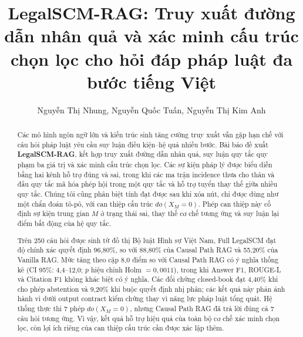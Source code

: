 \documentclass[runningheads]{llncs}
\begin{document}
\title{LegalSCM-RAG: Truy xuất đường dẫn nhân quả và xác minh cấu trúc chọn lọc cho hỏi đáp pháp luật đa bước tiếng Việt}

\author{Nguyễn Thị Nhung, Nguyễn Quốc Tuấn, Nguyễn Thị Kim Anh}


\maketitle
\pagestyle{empty}

\begin{abstract}
Các mô hình ngôn ngữ lớn và kiến trúc sinh tăng cường truy xuất vẫn gặp hạn chế
với câu hỏi pháp luật yêu cầu suy luận điều kiện--hệ quả nhiều bước. Bài báo đề
xuất \textbf{LegalSCM-RAG}, kết hợp truy xuất đường dẫn nhân quả, suy luận quy
tắc quy phạm ba giá trị và xác minh cấu trúc chọn lọc. Các sự kiện pháp lý được
biểu diễn bằng hai kênh hỗ trợ đúng và sai, trong khi các ma trận incidence thưa
cho thân và đầu quy tắc mã hóa phép hội trong một quy tắc và hỗ trợ tuyển thay
thế giữa nhiều quy tắc. Chúng tôi cũng phân biệt tính đạt được sau khi xóa nút,
chỉ được dùng như một chẩn đoán tô-pô, với can thiệp cấu trúc $do(X_M=0)$.
Phép can thiệp này cố định sự kiện trung gian $M$ ở trạng thái sai, thay thế cơ
chế tương ứng và suy luận lại điểm bất động của hệ quy tắc.

Trên 250 câu hỏi được sinh từ đồ thị Bộ luật Hình sự Việt Nam, Full LegalSCM đạt
độ chính xác quyết định 96,80\%, so với 88,80\% của Causal Path RAG và 55,20\%
của Vanilla RAG. Mức tăng theo cặp 8,0 điểm so với Causal Path RAG có ý nghĩa
thống kê (CI 95\%: 4,4--12,0; $p$ hiệu chỉnh Holm $=0,0011$), trong khi Answer
F1, ROUGE-L và Citation F1 không khác biệt có ý nghĩa. Các đối chứng closed-book
đạt 4,40\% khi cho phép abstention và 9,20\% khi buộc quyết định nhị phân; các
kết quả này phản ánh hành vi dưới output contract kiểm chứng thay vì năng lực
pháp luật tổng quát. Hệ thống thực thi 7 phép $do(X_M=0)$, nhưng Causal Path RAG
đã trả lời đúng cả 7 câu hỏi tương ứng. Vì vậy, kết quả hỗ trợ hiệu quả của toàn
bộ cơ chế xác minh chọn lọc, còn lợi ích riêng của can thiệp cấu trúc cần được
xác lập thêm.

\end{abstract}













\end{document}
